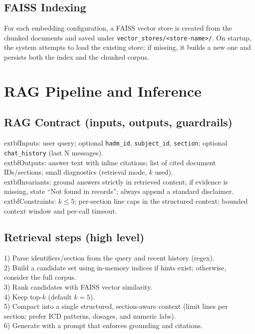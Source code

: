 \subsection{FAISS Indexing}
For each embedding configuration, a FAISS vector store is created from the chunked documents and saved under \texttt{vector\_stores/<store-name>/}. On startup, the system attempts to load the existing store; if missing, it builds a new one and persists both the index and the chunked corpus.

\section{RAG Pipeline and Inference}

\subsection{RAG Contract (inputs, outputs, guardrails)}
	extbf{Inputs:} user query; optional \texttt{hadm\_id}, \texttt{subject\_id}, \texttt{section}; optional \texttt{chat\_history} (last N messages).\\
	extbf{Outputs:} answer text with inline citations; list of cited document IDs/sections; small diagnostics (retrieval mode, \(k\) used).\\
	extbf{Invariants:} ground answers strictly in retrieved content; if evidence is missing, state ``Not found in records''; always append a standard disclaimer.\\
	extbf{Constraints:} \(k \le 5\); per-section line caps in the structured context; bounded context window and per-call timeout.

\subsection{Retrieval steps (high level)}
1) Parse identifiers/section from the query and recent history (regex).\\
2) Build a candidate set using in-memory indices if hints exist; otherwise, consider the full corpus.\\
3) Rank candidates with FAISS vector similarity.\\
4) Keep top-\(k\) (default \(k=5\)).\\
5) Compact into a single structured, section-aware context (limit lines per section; prefer ICD patterns, dosages, and numeric labs).\\
6) Generate with a prompt that enforces grounding and citations.

